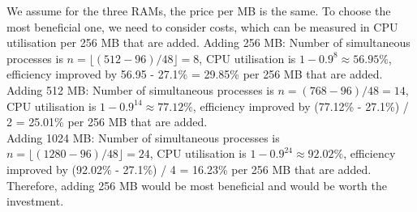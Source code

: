 \documentclass[a4paper]{article}
\begin{document}
\begin{enumerate}
\begin{enumerate}
        We assume for the three RAMs, the price per MB is the same. To choose the most beneficial one, we need to consider costs, which can be measured in CPU utilisation per 256 MB that are added.
        Adding 256 MB: Number of simultaneous processes is $n=\lfloor(512-96)/48\rfloor=8$, CPU utilisation is $1-0.9^8\approx56.95\%$, efficiency improved by 56.95 - 27.1\% = 29.85\% per 256 MB that are added.\\  %
        Adding 512 MB: Number of simultaneous processes is $n=(768-96)/48=14$, CPU utilisation is $1-0.9^{14}\approx77.12\%$, efficiency improved by (77.12\% - 27.1\%) / 2 = 25.01\% per 256 MB that are added.\\
        Adding 1024 MB: Number of simultaneous processes is $n=\lfloor(1280-96)/48\rfloor=24$, CPU utilisation is $1-0.9^{24}\approx92.02\%$, efficiency improved by (92.02\% - 27.1\%) / 4 = 16.23\% per 256 MB that are added.\\  %
        Therefore, adding 256 MB would be most beneficial and would be worth the investment.
    \end{enumerate}
\end{enumerate}
\end{document}
